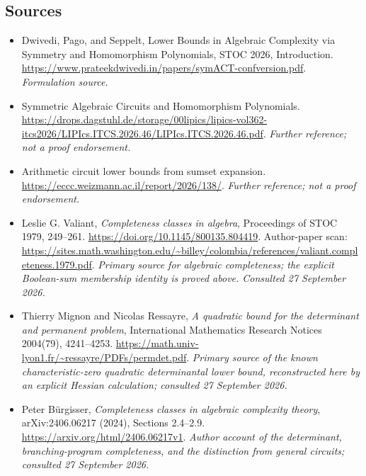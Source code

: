 \documentclass[11pt]{article}
\begin{document}
\subsection{Sources}
\begin{itemize}
\item[S1]Dwivedi, Pago, and Seppelt, Lower Bounds in Algebraic Complexity via Symmetry and Homomorphism Polynomials, STOC 2026, Introduction.
\url{https://www.prateekdwivedi.in/papers/symACT-confversion.pdf}.
\textit{Formulation source.}
\item[S2]Symmetric Algebraic Circuits and Homomorphism Polynomials.
\url{https://drops.dagstuhl.de/storage/00lipics/lipics-vol362-itcs2026/LIPIcs.ITCS.2026.46/LIPIcs.ITCS.2026.46.pdf}.
\textit{Further reference; not a proof endorsement.}
\item[S3]Arithmetic circuit lower bounds from sumset expansion.
\url{https://eccc.weizmann.ac.il/report/2026/138/}.
\textit{Further reference; not a proof endorsement.}
\item[E1]Leslie G. Valiant, \emph{Completeness classes in algebra}, Proceedings of STOC 1979, 249--261.
\url{https://doi.org/10.1145/800135.804419}.
Author-paper scan: \url{https://sites.math.washington.edu/~billey/colombia/references/valiant.completeness.1979.pdf}.
\textit{Primary source for algebraic completeness; the explicit Boolean-sum membership identity is proved above. Consulted 27 September 2026.}
\item[E2]Thierry Mignon and Nicolas Ressayre, \emph{A quadratic bound for the determinant and permanent problem}, International Mathematics Research Notices 2004(79), 4241--4253.
\url{https://math.univ-lyon1.fr/~ressayre/PDFs/permdet.pdf}.
\textit{Primary source of the known characteristic-zero quadratic determinantal lower bound, reconstructed here by an explicit Hessian calculation; consulted 27 September 2026.}
\item[E3]Peter B\"urgisser, \emph{Completeness classes in algebraic complexity theory}, arXiv:2406.06217 (2024), Sections 2.4--2.9.
\url{https://arxiv.org/html/2406.06217v1}.
\textit{Author account of the determinant, branching-program completeness, and the distinction from general circuits; consulted 27 September 2026.}
\end{itemize}
\end{document}
